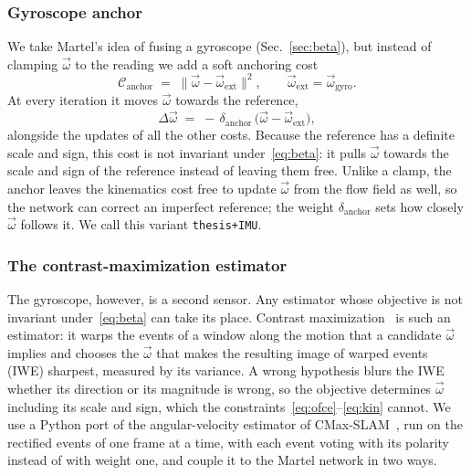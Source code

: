 \documentclass[journal]{IEEEtran}
\newcommand{\wvec}{\vec{\omega}}
\begin{document}
\subsubsection{Gyroscope anchor}
We take Martel's idea of fusing a gyroscope (Sec.~\ref{sec:beta}), but instead of clamping $\wvec$ to the reading we add a soft anchoring cost
\begin{equation}
\mathcal{C}_{\text{anchor}} \;=\; \|\wvec - \wvec_{\text{ext}}\|^2,
\qquad \wvec_{\text{ext}} = \wvec_{\text{gyro}}.
\label{eq:anchorcost}
\end{equation}
At every iteration it moves $\wvec$ towards the reference,
\begin{equation}
\Delta \wvec \;=\; -\,\delta_{\text{anchor}}\,\big(\wvec - \wvec_{\text{ext}}\big),
\label{eq:anchor}
\end{equation}
alongside the updates of all the other costs. Because the reference has a definite scale and sign, this cost is not invariant under~\eqref{eq:beta}: it pulls $\wvec$ towards the scale and sign of the reference instead of leaving them free. Unlike a clamp, the anchor leaves the kinematics cost free to update $\wvec$ from the flow field as well, so the network can correct an imperfect reference; the weight $\delta_{\text{anchor}}$ sets how closely $\wvec$ follows it. We call this variant \texttt{thesis+IMU}.
 
\subsubsection{The contrast-maximization estimator}
\label{sec:coupling}
The gyroscope, however, is a second sensor. Any estimator whose objective is not invariant under~\eqref{eq:beta} can take its place. Contrast maximization~\cite{gallego2018cmax} is such an estimator: it warps the events of a window along the motion that a candidate $\wvec$ implies and chooses the $\wvec$ that makes the resulting image of warped events (IWE) sharpest, measured by its variance. A wrong hypothesis blurs the IWE whether its direction or its magnitude is wrong, so the objective determines $\wvec$ including its scale and sign, which the constraints~\eqref{eq:ofce}--\eqref{eq:kin} cannot. We use a Python port of the angular-velocity estimator of CMax-SLAM~\cite{guo2024cmaxslam}, run on the rectified events of one frame at a time, with each event voting with its polarity instead of with weight one, and couple it to the Martel network in two ways.
\end{document}
